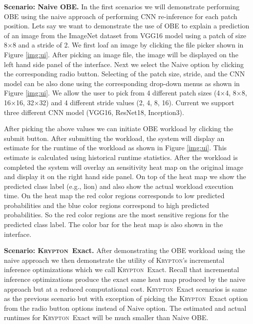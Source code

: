 \documentclass{vldb}
\newcommand{\system}{\textsc{Krypton}}
\begin{document}
\vspace{2mm}
\noindent \textbf{Scenario: Naive OBE.} In the first scenarios we will demonstrate performing OBE using the naive approach of performing CNN re-inference for each patch position.
Lets say we want to demonstrate the use of OBE to explain a prediction of an image from the ImageNet dataset from VGG16 model using a patch of size 8$\times$8 and a stride of 2.
We first loaf an image by clicking the file picker shown in Figure \ref{img:ui}.
After picking an image file, the image will be displayed on the left hand side panel of the interface.
Next we select the Naive option by clicking the corresponding radio button.
Selecting of the patch size, stride, and the CNN model can be also done using the corresponding drop-down menus as shown in Figure \ref{img:ui}.
We allow the user to pick from 4 different patch sizes (4$\times$4, 8$\times$8, 16$\times$16, 32$\times$32) and 4 different stride values (2, 4, 8, 16).
Current we support three different CNN model (VGG16, ResNet18, Inception3).

After picking the above values we can initiate OBE workload by clicking the submit button.
After submitting the workload, the system will display an estimate for the runtime of the workload as shown in Figure \ref{img:ui}.
This estimate is calculated using historical runtime statistics.
After the workload is completed the system will overlay an sensitivity heat map on the original image and display it on the right hand side panel.
On top of the heat map we show the predicted class label (e.g., lion) and also show the actual workload execution time.
On the heat map the red color regions corresponds to low predicted probabilities and the blue color regions correspond to high predicted probabilities. So the red color regions are the most sensitive regions for the predicted class label.
The color bar for the heat map is also shown in the interface.


\vspace{2mm}
\noindent \textbf{Scenario: \system~Exact.} After demonstrating the OBE workload using the naive approach we then demonstrate the utility of \system's incremental inference optimizations which we call \system~Exact.
Recall that incremental inference optimizations produce the exact same heat map produced by the naive approach but at a reduced computational cost.
\system~Exact scenarios is same as the previous scenario but with exception of picking the \system~Exact option from the radio button options instead of Naive option.
The estimated and actual runtimes for \system~Exact will be much smaller than Naive OBE.
\end{document}
